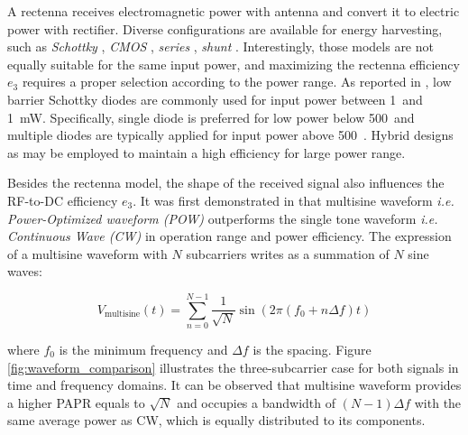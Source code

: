 A rectenna receives electromagnetic power with antenna and convert it to electric power with rectifier. Diverse configurations are available for energy harvesting, such as \textit{Schottky} \cite{Akkermans2005, Boaventura2013}, \textit{CMOS} \cite{Stoopman2014, Valenta2014}, \textit{series} \cite{Georgiadis2011, Collado2013}, \textit{shunt} \cite{McSpadden1998, Guo2012}. Interestingly, those models are not equally suitable for the same input power, and maximizing the rectenna efficiency ${e_3}$ requires a proper selection according to the power range. As reported in \cite{Valenta2014, Costanzo2016}, low barrier Schottky diodes are commonly used for input power between 1~\muW and 1~mW. Specifically, single diode is preferred for low power below 500~\muW and multiple diodes are typically applied for input power above 500~\muW \cite{Clerckx2019}. Hybrid designs as \cite{Sun2013} may be employed to maintain a high efficiency for large power range.

Besides the rectenna model, the shape of the received signal also influences the RF-to-DC efficiency ${e_3}$. It was first demonstrated in \cite{Trotter2009} that multisine waveform \textit{i.e. Power-Optimized waveform (POW)} outperforms the single tone waveform \textit{i.e. Continuous Wave (CW)} in operation range and power efficiency. The expression of a multisine waveform with $N$ subcarriers writes as a summation of $N$ sine waves:

\begin{equation}\label{eqn:multisine}
  {V_{{\text{multisine}}}}(t) = \sum\limits_{n = 0}^{N - 1} {\frac{1}{{\sqrt N }}} \sin \left( {2\pi \left( {{f_{\text{0}}} + n\Delta f} \right)t} \right)
\end{equation}

where ${{f_{\text{0}}}}$ is the minimum frequency and ${\Delta f}$ is the spacing. Figure \ref{fig:waveform_comparison} \cite{Trotter2009} illustrates the three-subcarrier case for both signals in time and frequency domains. It can be observed that multisine waveform provides a higher PAPR equals to ${\sqrt N }$ and occupies a bandwidth of $(N - 1) \Delta f$ with the same average power as CW, which is equally distributed to its components.

